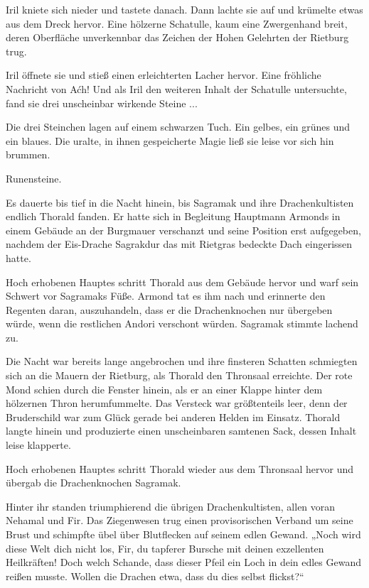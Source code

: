 Iril kniete sich nieder und tastete danach. Dann lachte sie auf und krümelte etwas aus dem Dreck hervor. Eine hölzerne Schatulle, kaum eine Zwergenhand breit, deren Oberfläche unverkennbar das Zeichen der Hohen Gelehrten der Rietburg trug.

Iril öffnete sie und stieß einen erleichterten Lacher hervor. Eine fröhliche Nachricht von Aćh! Und als Iril den weiteren Inhalt der Schatulle untersuchte, fand sie drei unscheinbar wirkende Steine ...

Die drei Steinchen lagen auf einem schwarzen Tuch. Ein gelbes, ein grünes und ein blaues. Die uralte, in ihnen gespeicherte Magie ließ sie leise vor sich hin brummen.

Runensteine.\bigskip







Es dauerte bis tief in die Nacht hinein, bis Sagramak und ihre Drachenkultisten endlich Thorald fanden. Er hatte sich in Begleitung Hauptmann Armonds in einem Gebäude an der Burgmauer verschanzt und seine Position erst aufgegeben, nachdem der Eis-Drache Sagrakdur das mit Rietgras bedeckte Dach eingerissen hatte.

Hoch erhobenen Hauptes schritt Thorald aus dem Gebäude hervor und warf sein Schwert vor Sagramaks Füße. Armond tat es ihm nach und erinnerte den Regenten daran, auszuhandeln, dass er die Drachenknochen nur übergeben würde, wenn die restlichen Andori verschont würden. Sagramak stimmte lachend zu.

Die Nacht war bereits lange angebrochen und ihre finsteren Schatten schmiegten sich an die Mauern der Rietburg, als Thorald den Thronsaal erreichte. Der rote Mond schien durch die Fenster hinein, als er an einer Klappe hinter dem hölzernen Thron herumfummelte. Das Versteck war größtenteils leer, denn der Bruderschild war zum Glück gerade bei anderen Helden im Einsatz. Thorald langte hinein und produzierte einen unscheinbaren samtenen Sack, dessen Inhalt leise klapperte.

Hoch erhobenen Hauptes schritt Thorald wieder aus dem Thronsaal hervor und übergab die Drachenknochen Sagramak.

Hinter ihr standen triumphierend die übrigen Drachenkultisten, allen voran Nehamal und Fir. Das Ziegenwesen trug einen provisorischen Verband um seine Brust und schimpfte übel über Blutflecken auf seinem edlen Gewand. „Noch wird diese Welt dich nicht los, Fir, du tapferer Bursche mit deinen exzellenten Heilkräften! Doch welch Schande, dass dieser Pfeil ein Loch in dein edles Gewand reißen musste. Wollen die Drachen etwa, dass du dies selbst flickst?“

